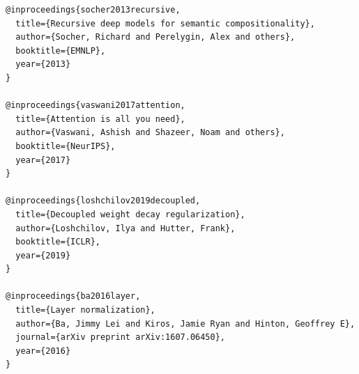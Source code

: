 \begin{lstlisting}
@inproceedings{socher2013recursive,
  title={Recursive deep models for semantic compositionality},
  author={Socher, Richard and Perelygin, Alex and others},
  booktitle={EMNLP},
  year={2013}
}

@inproceedings{vaswani2017attention,
  title={Attention is all you need},
  author={Vaswani, Ashish and Shazeer, Noam and others},
  booktitle={NeurIPS},
  year={2017}
}

@inproceedings{loshchilov2019decoupled,
  title={Decoupled weight decay regularization},
  author={Loshchilov, Ilya and Hutter, Frank},
  booktitle={ICLR},
  year={2019}
}

@inproceedings{ba2016layer,
  title={Layer normalization},
  author={Ba, Jimmy Lei and Kiros, Jamie Ryan and Hinton, Geoffrey E},
  journal={arXiv preprint arXiv:1607.06450},
  year={2016}
}
\end{lstlisting}
